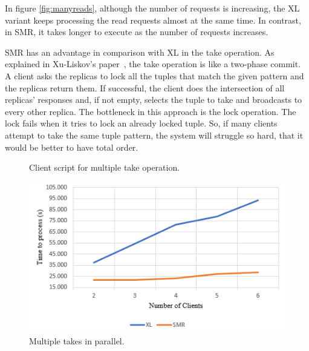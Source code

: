 \documentclass[times, 10pt,twocolumn]{article}
\begin{document}
In figure \ref{fig:manyreads}, although the number of requests is increasing, the XL variant keeps processing
the read requests almost at the same time. In contrast, in SMR, it takes longer to execute 
as the number of requests increases. 

SMR has an advantage in comparison with XL in the take operation. As explained in Xu-Liskov's paper~\cite{Xu1989ADF}, the take operation is like a two-phase commit. A client asks the replicas to lock all the tuples that match the given pattern and the replicas return them. If successful, the client does the intersection of all replicas' responses and, if not empty, selects the tuple to take and broadcasts to every other replica.
The bottleneck in this approach is the lock operation. The lock fails when it tries to lock an already locked tuple. So, if many clients attempt to take the same tuple pattern, the system will struggle so hard, that it would be better to have total order.
\newline\newline
{}
\begin{figure}[h]
\caption{Client script for multiple take operation.}
\label{fig:manytakes_code}
\end{figure}

\begin{figure}[h]
\centering
\includegraphics[width=1\linewidth]{images/manytakes.png}
\caption{Multiple takes in parallel.}
\label{fig:manytakes}
\end{figure}
\end{document}
